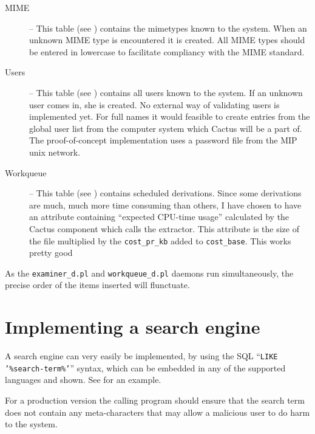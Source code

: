 \begin{description}


\item[MIME] -- This table (see ) contains the mimetypes known to the system.
  When an unknown MIME type is encountered it is created.  All MIME
  types should be entered in lowercase to facilitate compliancy with
  the MIME standard.



\item[Users] -- This table (see ) contains all users known to the system.  If
  an unknown user comes in, she is created.  No external way of
  validating users is implemented yet.  For full names it would
  feasible to create entries from the global user list from the
  computer system which Cactus will be a part of.  The
  proof-of-concept implementation uses a password file from the MIP
  unix network.



\item[Workqueue] -- This table (see )
contains scheduled derivations.  Since some derivations are much, much
more time consuming than others, I have chosen to have an attribute
containing ``expected CPU-time usage'' calculated by the Cactus
component which calls the extractor.  This attribute is the
size of the file multiplied by the \texttt{cost\_pr\_kb} added to
\texttt{cost\_base}. This works pretty good
  


\end{description}

As the \texttt{examiner\_d.pl} and \texttt{workqueue\_d.pl} daemons
run simultaneously, the precise order of the items inserted will
flunctuate.


\section{Implementing a search engine}

A search engine can very easily be implemented, by using the SQL
``\texttt{LIKE '\%search-term\%'}'' syntax, which can be embedded in
any of the supported languages and shown.   See
 for an example.

For a production version the calling program should ensure that the
search term does not contain any meta-characters that may allow a
malicious user to do harm to the system.

